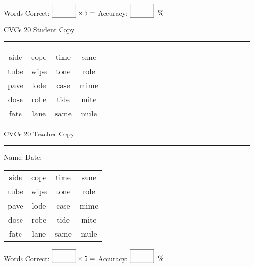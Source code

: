 \documentclass{memoir}
\begin{document}
\small

Words Correct: $\fbox{\phantom{\huge 100}} \times 5 = $ Accuracy: $\fbox{\phantom{\huge 100}}\;\; \%$ 

\vfill

\newpage



\footnotesize \noindent
CVCe 20 \hfill Student Copy
\smallskip
\hrule

\Large

\setlength{\tabcolsep}{14pt}
\def\arraystretch{2}

{\selectfont


\begin{vplace}[0.5]
\begin{center}
\begin{tabular}{cccc}
side & cope & time & sane \\
tube & wipe & tone & role \\
pave & lode & case & mime \\
dose & robe & tide & mite \\
fate & lane & same & mule \\
\end{tabular}
\end{center}
\end{vplace}

}

\newpage

\footnotesize \noindent
CVCe 20 \hfill Teacher Copy
\smallskip
\hrule

\small

\vfill

\noindent
Name: \underline{\hspace{1.75in}} \hfill Date: \underline{\hspace{1in}}

\Large

{\selectfont


\begin{vplace}[0.5]
\begin{center}
\begin{tabular}{cccc}
side & cope & time & sane \\
tube & wipe & tone & role \\
pave & lode & case & mime \\
dose & robe & tide & mite \\
fate & lane & same & mule \\
\end{tabular}
\end{center}
\end{vplace}



}

\small

Words Correct: $\fbox{\phantom{\huge 100}} \times 5 = $ Accuracy: $\fbox{\phantom{\huge 100}}\;\; \%$ 

\vfill

\end{document}
